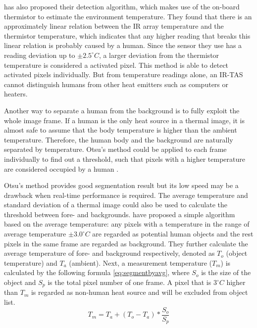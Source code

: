 \citeauthor{trofimova2017indoor} \cite{trofimova2017indoor} has also proposed their detection algorithm, which makes use of the on-board thermistor to estimate the environment temperature. They found that there is an approximately linear relation between the IR array temperature and the thermistor temperature, which indicates that any higher reading that breaks this linear relation is probably caused by a human. Since the sensor they use has a reading deviation up to $\pm 2.5^{\circ}C$, a larger deviation from the thermistor temperature is considered a activated pixel. This method is able to detect activated pixels individually. But from temperature readings alone, an IR-TAS cannot distinguish humans from other heat emitters such as computers or heaters.

Another way to separate a human from the background is to fully exploit the whole image frame. If a human is the only heat source in a thermal image, it is almost safe to assume that the body temperature is higher than the ambient temperature. Therefore, the human body and the background are naturally separated by temperature. Otsu's method could be applied to each frame individually to find out a threshold, such that pixels with a higher temperature are considered occupied by a human \cite{firstflow}.

Otsu's method provides good segmentation result but its low speed may be a drawback when real-time performance is required. The average temperature and standard deviation of a thermal image could also be used to calculate the threshold between fore- and backgrounds. \citeauthor{virtualtrack} \cite{virtualtrack} have proposed a simple algorithm based on the average temperature: any pixels with a temperature in the range of average temperature $\pm 3.0^\circ C$ are regarded as potential human objects and the rest pixels in the same frame are regarded as background. 
They further calculate the average temperature of fore- and background respectively, denoted as $T_o$ (object temperature) and $T_a$ (ambient). Next, a measurement temperature ($T_m$) is calculated by the following formula \autoref{eq:segmentbyavg}, where $S_o$ is the size of the object and $S_p$ is the total pixel number of one frame. A pixel that is $3^\circ C$ higher than $T_m$ is regarded as non-human heat source and will be excluded from object list.
\begin{equation}\label{eq:segmentbyavg}
  T_m = T_a + (T_o-T_a)*\frac{S_o}{S_p}
\end{equation}

